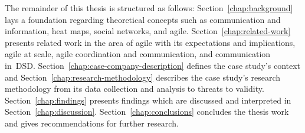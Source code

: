 The remainder of this thesis is structured as follows: Section~\ref{chap:background} lays a foundation regarding theoretical concepts such as communication and information, heat maps, social networks, and agile. Section~\ref{chap:related-work} presents related work in the area of agile with its expectations and implications, agile at scale, agile coordination and communication, and communication in~\ac{DSD}. Section~\ref{chap:case-company-description} defines the case study's context and Section~\ref{chap:research-methodology} describes the case study's research methodology from its data collection and analysis to threats to validity. Section~\ref{chap:findings} presents findings which are discussed and interpreted in Section~\ref{chap:discussion}. Section~\ref{chap:conclusions} concludes the thesis work and gives recommendations for further research.
